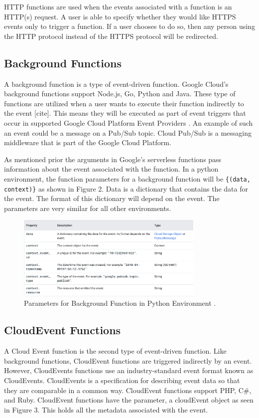 \documentclass[10pt, conference]{IEEEtran}
\begin{document}
HTTP functions are used when the events associated with a function is an HTTP(s) request. A user is able to specify whether they would like HTTPS events only to trigger a function. If a user chooses to do so, then any person using the HTTP protocol instead of the HTTPS protocol will be redirected. 

\subsection{Background Functions}

A background function is a type of event-driven function. Google Cloud's background functions support Node.js, Go, Python and Java. These type of functions are utilized when a user wants to execute their function indirectly to the event [cite]. This means they will be executed as part of event triggers that occur in supported Google Cloud Platform Event Providers \cite{b7}. An example of such an event could be a message on a Pub/Sub topic. Cloud Pub/Sub is a messaging middleware that is part of the Google Cloud Platform. 

As mentioned prior the arguments in Google's serverless functions pass information about the event associated with the function. In a python environment, the function parameters for a background function will be \verb|{(data, context)}| as shown in Figure 2. Data is a dictionary that contains the data for the event. The format of this dictionary will depend on the event. The parameters are very similar for all other environments. 

\begin{figure}[htbp]
\centerline{\includegraphics[width=9cm]{background_parameters.PNG}}
\caption{Parameters for Background Function in Python Environment \cite{b6}.}
\label{fig}
\end{figure}

\subsection{CloudEvent Functions}

A Cloud Event function is the second type of event-driven function. Like background functions, CloudEvent functions are triggered indirectly by an event. However, CloudEvents functions use an industry-standard event format known as CloudEvents. CloudEvents is a specification for describing event data so that they are comparable in a common way. CloudEvent functions support PHP, C\#, and Ruby. CloudEvent functions have the parameter, a cloudEvent object as seen in Figure 3. This holds all the metadata associated with the event.
\end{document}
